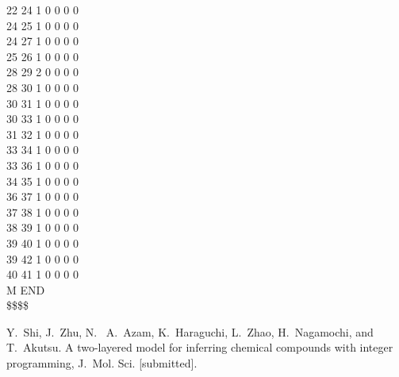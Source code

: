 \documentclass[11pt,titlepage,dvipdfmx,twoside]{jarticle}
\begin{document}
\begin{oframed}
{ 22 24  1  0  0  0  0                                                   \\
 24 25  1  0  0  0  0                                                   \\
 24 27  1  0  0  0  0                                                   \\
 25 26  1  0  0  0  0                                                   \\
 28 29  2  0  0  0  0                                                   \\
 28 30  1  0  0  0  0                                                   \\
 30 31  1  0  0  0  0                                                   \\
 30 33  1  0  0  0  0                                                   \\
 31 32  1  0  0  0  0                                                   \\
 33 34  1  0  0  0  0                                                   \\
 33 36  1  0  0  0  0                                                   \\
 34 35  1  0  0  0  0                                                   \\
 36 37  1  0  0  0  0                                                   \\
 37 38  1  0  0  0  0                                                   \\
 38 39  1  0  0  0  0                                                   \\
 39 40  1  0  0  0  0                                                   \\
 39 42  1  0  0  0  0                                                   \\
 40 41  1  0  0  0  0                                                   \\
M  END                                                                  \\
\$\$\$\$                                                                \\
}
\end{oframed}
\begin{thebibliography}{10}
	  Y.~Shi, J.~Zhu, N.~ A.~Azam, K.~Haraguchi, 
	  L.~Zhao, H.~Nagamochi, and T.~Akutsu. 
	  A two-layered model for inferring chemical
compounds with integer programming, 
	  J.~Mol. Sci. [submitted]. 
\end{thebibliography}
\end{document}
